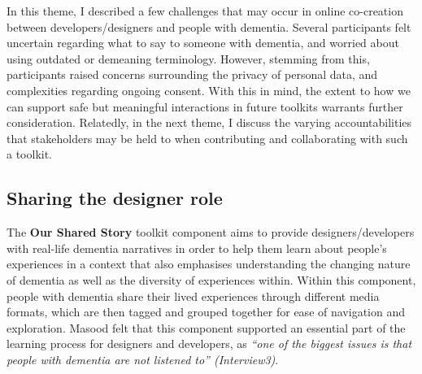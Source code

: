 In this theme, I described a few challenges that may occur in online co-creation between developers/designers and people with dementia. Several participants felt uncertain regarding what to say to someone with dementia, and worried about using outdated or demeaning terminology. However, stemming from this, participants raised concerns surrounding the privacy of personal data, and complexities regarding ongoing consent. With this in mind, the extent to how we can support safe but meaningful interactions in future toolkits warrants further consideration. Relatedly, in the next theme, I discuss the varying accountabilities that stakeholders may be held to when contributing and collaborating with such a toolkit.

\subsection{Sharing the designer role}
The \textbf{Our Shared Story} toolkit component aims to provide designers/developers with real-life dementia narratives in order to help them learn about people’s experiences in a context that also emphasises understanding the changing nature of dementia as well as the diversity of experiences within. Within this component, people with dementia share their lived experiences through different media formats, which are then tagged and grouped together for ease of navigation and exploration. Masood felt that this component supported an essential part of the learning process for designers and developers, as \textit{``one of the biggest issues is that people with dementia are not listened to'' (Interview3)}. 

